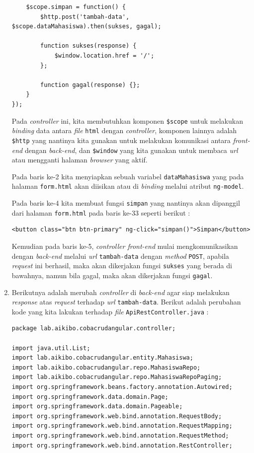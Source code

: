 \begin{enumerate}
\begin{lstlisting}
    $scope.simpan = function() {
        $http.post('tambah-data', $scope.dataMahasiswa).then(sukses, gagal);
        
        function sukses(response) {
            $window.location.href = '/';
        };
        
        function gagal(response) {};
    }
});
	\end{lstlisting}
	
	Pada \textit{controller} ini, kita membutuhkan komponen \texttt{\$scope} untuk melakukan \textit{binding} data antara \textit{file} \texttt{html} dengan \textit{controller}, komponen lainnya adalah \texttt{\$http} yang nantinya kita gunakan untuk melakukan komunikasi antara \textit{front-end} dengan \textit{back-end}, dan \texttt{\$window} yang kita gunakan untuk membaca \textit{url} atau mengganti halaman \textit{browser} yang aktif.
	
	Pada baris ke-2 kita menyiapkan sebuah variabel \texttt{dataMahasiswa} yang pada halaman \texttt{form.html} akan diisikan atau di \textit{binding} melalui atribut \texttt{ng-model}. 
	
	Pada baris ke-4 kita membuat fungsi \texttt{simpan} yang nantinya akan dipanggil dari halaman \texttt{form.html} pada baris ke-33 seperti berikut :
	
	\begin{lstlisting}[firstnumber=33]
<button class="btn btn-primary" ng-click="simpan()">Simpan</button> \end{lstlisting}

	Kemudian pada baris ke-5, \textit{controller front-end} mulai mengkomunikasikan dengan \textit{back-end} melalui \textit{url} \texttt{tambah-data} dengan \textit{method} \texttt{POST}, apabila \textit{request} ini berhasil, maka akan dikerjakan fungsi \texttt{sukses} yang berada di bawahnya, namun bila gagal, maka akan dikerjakan fungsi \texttt{gagal}.
	
	\item Berikutnya adalah merubah \textit{controller} di \textit{back-end} agar siap melakukan \textit{response} atas \textit{request} terhadap \textit{url} \texttt{tambah-data}. Berikut adalah perubahan kode yang kita lakukan terhadap \textit{file} \texttt{ApiRestController.java} :
	
	\begin{lstlisting}
package lab.aikibo.cobacrudangular.controller;

import java.util.List;
import lab.aikibo.cobacrudangular.entity.Mahasiswa;
import lab.aikibo.cobacrudangular.repo.MahasiswaRepo;
import lab.aikibo.cobacrudangular.repo.MahasiswaRepoPaging;
import org.springframework.beans.factory.annotation.Autowired;
import org.springframework.data.domain.Page;
import org.springframework.data.domain.Pageable;
import org.springframework.web.bind.annotation.RequestBody;
import org.springframework.web.bind.annotation.RequestMapping;
import org.springframework.web.bind.annotation.RequestMethod;
import org.springframework.web.bind.annotation.RestController;


\end{lstlisting}
\end{enumerate}
